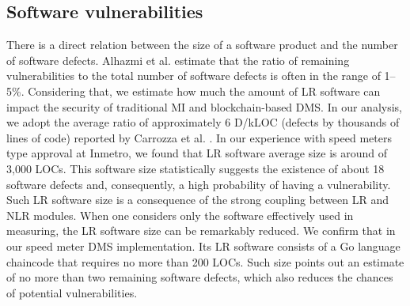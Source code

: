 \documentclass[journal]{IEEEtran}
\begin{document}
\subsection{Software vulnerabilities}
There is a direct relation between the size of a software product and the number of software defects.
Alhazmi et al. \cite{Alhazmi2007} estimate that the ratio of remaining vulnerabilities to the total number of software defects is often in the range of 1–5\%.
Considering that, we estimate how much the amount of LR software can impact the security of traditional MI and blockchain-based DMS.
In our analysis, we adopt the average ratio of approximately 6 D/kLOC (defects by thousands of lines of code) reported by Carrozza et al. \cite{Carrozza2015}.
In our experience with speed meters type approval at Inmetro, we found that LR software average size is around of 3,000 LOCs.
This software size statistically suggests the existence of about 18 software defects and, consequently, a high probability of having a vulnerability.
Such LR software size is a consequence of the strong coupling between LR and NLR modules.
When one considers only the software effectively used in measuring, the LR software size can be remarkably reduced.
We confirm that in our speed meter DMS implementation.
Its LR software consists of a Go language chaincode that requires no more than 200 LOCs.
Such size points out an estimate of no more than two remaining software defects, which also reduces the chances of potential vulnerabilities.

\end{document}
